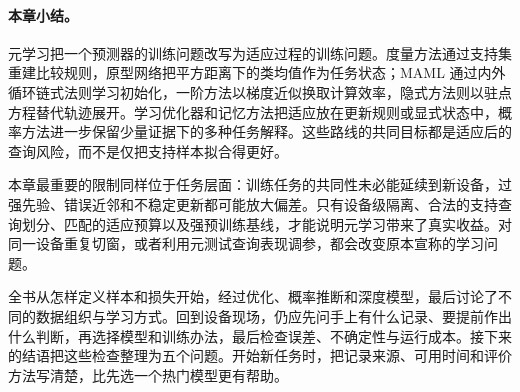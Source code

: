 \paragraph{本章小结。}
元学习把一个预测器的训练问题改写为适应过程的训练问题。度量方法通过支持集重建比较规则，原型网络把平方距离下的类均值作为任务状态；MAML 通过内外循环链式法则学习初始化，一阶方法以梯度近似换取计算效率，隐式方法则以驻点方程替代轨迹展开。学习优化器和记忆方法把适应放在更新规则或显式状态中，概率方法进一步保留少量证据下的多种任务解释。这些路线的共同目标都是适应后的查询风险，而不是仅把支持样本拟合得更好。

本章最重要的限制同样位于任务层面：训练任务的共同性未必能延续到新设备，过强先验、错误近邻和不稳定更新都可能放大偏差。只有设备级隔离、合法的支持查询划分、匹配的适应预算以及强预训练基线，才能说明元学习带来了真实收益。对同一设备重复切窗，或者利用元测试查询表现调参，都会改变原本宣称的学习问题。

全书从怎样定义样本和损失开始，经过优化、概率推断和深度模型，最后讨论了不同的数据组织与学习方式。回到设备现场，仍应先问手上有什么记录、要提前作出什么判断，再选择模型和训练办法，最后检查误差、不确定性与运行成本。接下来的结语把这些检查整理为五个问题。开始新任务时，把记录来源、可用时间和评价方法写清楚，比先选一个热门模型更有帮助。
